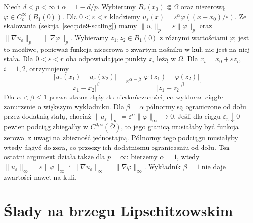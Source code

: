 \begin{uwaga}
Niech $d<p<\infty$ i $\alpha=1-d/p$. Wybieramy
$B_r(x_0)\Subset\Omega$ oraz niezerową
$\varphi\in C_c^\infty(B_1(0))$. Dla $0<\varepsilon<r$
kładziemy $u_\varepsilon(x)=\varepsilon^\alpha
\varphi((x-x_0)/\varepsilon)$.
Ze skalowania (sekcja~\ref{sec:pde9-scaling}) mamy
$\|u_\varepsilon\|_p=\varepsilon\|\varphi\|_p$ oraz
$\|\nabla u_\varepsilon\|_p=\|\nabla\varphi\|_p$.
Wybieramy $z_1,z_2\in B_1(0)$ z różnymi wartościami
$\varphi$; jest to możliwe, ponieważ funkcja niezerowa
o zwartym nośniku w kuli nie jest na niej stała.
Dla $0<\varepsilon<r$ oba odpowiadające punkty
$x_i$ leżą w $\Omega$. Dla $x_i=x_0+\varepsilon z_i$, $i=1,2$,
otrzymujemy
\[
 \frac{|u_\varepsilon(x_1)-u_\varepsilon(x_2)|}
 {|x_1-x_2|^\beta}
 =\varepsilon^{\alpha-\beta}
 \frac{|\varphi(z_1)-\varphi(z_2)|}{|z_1-z_2|^\beta}.
\]
Dla $\alpha<\beta\le1$ prawa strona dąży do nieskończoności,
co wyklucza ciągłe zanurzenie o większym wykładniku.
Dla $\beta=\alpha$ półnormy są ograniczone od dołu
przez dodatnią stałą, chociaż
$\|u_\varepsilon\|_\infty=\varepsilon^\alpha
\|\varphi\|_\infty\to0$. Jeśli dla ciągu
$\varepsilon_n\downarrow0$ pewien podciąg zbiegałby
w $C^{0,\alpha}(\overline\Omega)$, to jego granicą
musiałaby być funkcja zerowa, z uwagi na zbieżność
jednostajną. Półnormy tego podciągu musiałyby wtedy
dążyć do zera, co przeczy ich dodatniemu ograniczeniu
od dołu.
Ten ostatni argument działa także dla $p=\infty$:
bierzemy $\alpha=1$, wtedy $\|u_\varepsilon\|_\infty
=\varepsilon\|\varphi\|_\infty$ i
$\|\nabla u_\varepsilon\|_\infty=\|\nabla\varphi\|_\infty$.
Wykładnik $\beta=1$ nie daje zwartości nawet na kuli.
\end{uwaga}

\section{Ślady na brzegu Lipschitzowskim}
\label{sec:pde10-traces}

